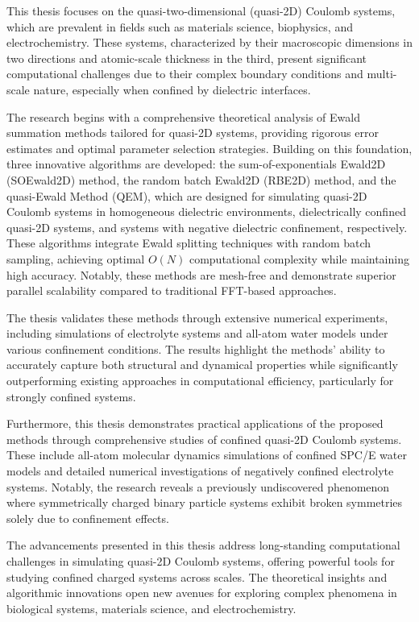 This thesis focuses on the quasi-two-dimensional (quasi-2D) Coulomb systems, which are prevalent in fields such as materials science, biophysics, and electrochemistry. 
These systems, characterized by their macroscopic dimensions in two directions and atomic-scale thickness in the third, present significant computational challenges due to their complex boundary conditions and multi-scale nature, especially when confined by dielectric interfaces.

The research begins with a comprehensive theoretical analysis of Ewald summation methods tailored for quasi-2D systems, providing rigorous error estimates and optimal parameter selection strategies. 
Building on this foundation, three innovative algorithms are developed: the sum-of-exponentials Ewald2D (SOEwald2D) method, the random batch Ewald2D (RBE2D) method, and the quasi-Ewald Method (QEM), which are designed for simulating quasi-2D Coulomb systems in homogeneous dielectric environments, dielectrically confined quasi-2D systems, and systems with negative dielectric confinement, respectively.
These algorithms integrate Ewald splitting techniques with random batch sampling, achieving optimal $O(N)$ computational complexity while maintaining high accuracy. 
Notably, these methods are mesh-free and demonstrate superior parallel scalability compared to traditional FFT-based approaches.

The thesis validates these methods through extensive numerical experiments, including simulations of electrolyte systems and all-atom water models under various confinement conditions. 
The results highlight the methods' ability to accurately capture both structural and dynamical properties while significantly outperforming existing approaches in computational efficiency, particularly for strongly confined systems.

Furthermore, this thesis demonstrates practical applications of the proposed methods through comprehensive studies of confined quasi-2D Coulomb systems. 
These include all-atom molecular dynamics simulations of confined SPC/E water models and detailed numerical investigations of negatively confined electrolyte systems. 
Notably, the research reveals a previously undiscovered phenomenon where symmetrically charged binary particle systems exhibit broken symmetries solely due to confinement effects.

The advancements presented in this thesis address long-standing computational challenges in simulating quasi-2D Coulomb systems, offering powerful tools for studying confined charged systems across scales. 
The theoretical insights and algorithmic innovations open new avenues for exploring complex phenomena in biological systems, materials science, and electrochemistry.